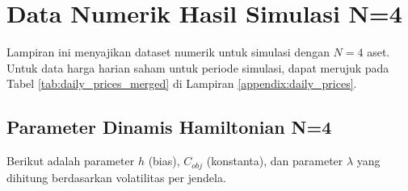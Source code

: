 \chapter{Data Numerik Hasil Simulasi N=4}
\label{appendix:numerical_data_n4}

Lampiran ini menyajikan dataset numerik untuk simulasi dengan $N=4$ aset. Untuk data harga harian saham untuk periode simulasi, dapat merujuk pada Tabel \ref{tab:daily_prices_merged} di Lampiran \ref{appendix:daily_prices}.

\section{Parameter Dinamis Hamiltonian N=4}

Berikut adalah parameter $h$ (bias), $C_{obj}$ (konstanta), dan parameter $\lambda$ yang dihitung berdasarkan volatilitas per jendela. 

